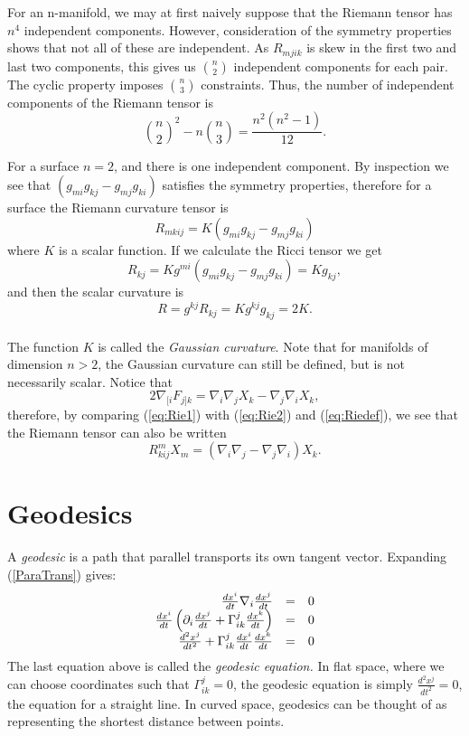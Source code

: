 For an n-manifold, we may at first naively suppose that the Riemann tensor has $n^4$ independent components. However, consideration of the symmetry properties shows that not all of these are independent. As $R_{mjik}$ is skew in the first two and last two components, this gives us $n\choose2$ independent components for each pair. The cyclic property imposes $n\choose3$ constraints. Thus, the number of independent components of the Riemann tensor is
\begin{equation} 
{n\choose2}^2 -n {n\choose3} =\frac{n^2(n^2-1)}{12}. 
\label{eq:compRie} 
\end{equation}

For a surface $n=2$, and there is one independent component. By inspection we see that $(g_{mi}g_{kj}-g_{mj}g_{ki})$ satisfies the symmetry properties, therefore for a surface the Riemann curvature tensor is 
\begin{equation} R_{mkij}=K(g_{mi}g_{kj}-g_{mj}g_{ki})\label{eq:Riesurface} \end{equation}
where $K$ is a scalar function. If we calculate the Ricci tensor we get
\begin{equation} R_{kj}=Kg^{mi}(g_{mi}g_{kj}-g_{mj}g_{ki})=Kg_{kj}, \label{riccisurface} \end{equation}
and then the scalar curvature is 
\begin{equation} R=g^{kj}R_{kj}=Kg^{kj}g_{kj}=2K. \label{scalarsurf} \end{equation}\\
The function $K$ is called the \textit{Gaussian curvature}. Note that for manifolds of dimension $n>2$, the Gaussian curvature can still be defined, but is not necessarily scalar. Notice that 
\begin{equation} 2\nabla_{[i}F_{j]k}=\nabla_i \nabla_j X_k-\nabla_j \nabla_i X_k, \label{eq:Rie1}\end{equation}
therefore, by comparing (\ref{eq:Rie1}) with (\ref{eq:Rie2}) and (\ref{eq:Riedef}), we see that the Riemann tensor can also be written
\[ R^m_{kij}X_m = (\nabla_i\nabla_j - \nabla_j \nabla_i)X_k.\]

\section{Geodesics}
A \textit{geodesic} is a path that parallel transports its own tangent vector. Expanding (\ref{ParaTrans}) gives:
\begin{equation}\label{geoEq}
\begin{array}{rcl}
\frac{dx^i}{dt}\nabla_i \frac{dx^j}{dt}&=&0 \\
\frac{dx^i}{dt}\left({\partial}_i \frac{dx^j}{dt} + \Gamma^j_{ik}\frac{dx^k}{dt} \right)&=&0 \\
\frac{d^2x^j}{dt^2} + \Gamma^j_{ik}\frac{dx^i}{dt} \frac{dx^k}{dt}&=&0
\end{array}
\end{equation}
The last equation above is called the \textit{geodesic equation.} In flat space, where we can choose coordinates such that $\Gamma^j_{ik}=0$, the geodesic equation is simply $\frac{d^2x^j}{dt^2}=0$, the equation for a straight line. In curved space, geodesics can be thought of as representing the shortest distance between points. 

